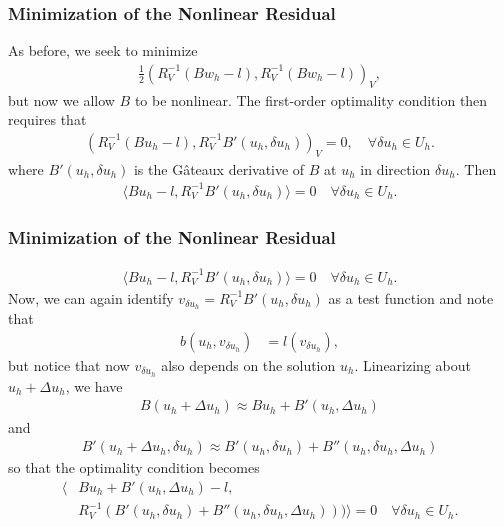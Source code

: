 \documentclass[mathserif]{beamer}
\begin{document}
\addtocounter{framenumber}{-1} %
\begin{frame}
\frametitle{Minimization of the Nonlinear Residual}
As before, we seek to minimize
\begin{align*}
\frac{1}{2} \left(R_{V}^{-1}\left(Bw_{h}-l\right), R_{V}^{-1}\left(Bw_{h}-l\right) \right)_{V},
\end{align*}
but now we allow $B$ to be nonlinear.  The first-order optimality condition then requires that
\begin{align*}
\left(R_{V}^{-1}\left(Bu_{h}-l\right), R_{V}^{-1}B'(u_{h},\delta u_{h}) \right)_{V} = 0, \quad \forall \delta u_{h} \in U_{h}.
\end{align*}
where $B'(u_{h},\delta u_{h})$ is the G\^ateaux derivative of $B$ at $u_{h}$ in direction $\delta u_{h}$.  Then
\begin{align*}
\langle Bu_{h} - l, R_{V}^{-1}B'(u_{h},\delta u_{h}) \rangle = 0 \quad \forall \delta u_{h} \in U_{h}.
\end{align*}
\end{frame}
\addtocounter{framenumber}{-1} %
\begin{frame}
\frametitle{Minimization of the Nonlinear Residual}
\begin{align*}
\langle Bu_{h} - l, R_{V}^{-1}B'(u_{h},\delta u_{h}) \rangle = 0 \quad \forall \delta u_{h} \in U_{h}.
\end{align*}
Now, we can again identify $v_{\delta u_{h}} = R_{V}^{-1}B'(u_{h},\delta u_{h})$ as a test function and note that
\begin{align*}
b(u_{h},v_{\delta u_{h}}) &= l(v_{\delta u_{h}}),
\end{align*}
but notice that now $v_{\delta u_{h}}$ also depends on the solution $u_{h}$.  Linearizing about $u_{h} + \Delta u_{h}$, we have
\begin{align*}
B(u_{h} + \Delta u_{h}) \approx Bu_{h} + B'(u_{h},\Delta u_{h})
\end{align*}
and
\begin{align*}
B'(u_{h} + \Delta u_{h},\delta u_{h}) \approx B'(u_{h},\delta u_{h}) + B''(u_{h},\delta u_{h},\Delta u_{h})
\end{align*}
so that the optimality condition becomes
\begin{align*}
\langle &Bu_{h} + B'(u_{h},\Delta u_{h}) - l,\\
             &R_{V}^{-1}\left( B'(u_{h},\delta u_{h}) + B''(u_{h},\delta u_{h},\Delta u_{h}) \right)) \rangle = 0 \quad \forall \delta u_{h} \in U_{h}.
\end{align*}
\end{frame}
\end{document}

